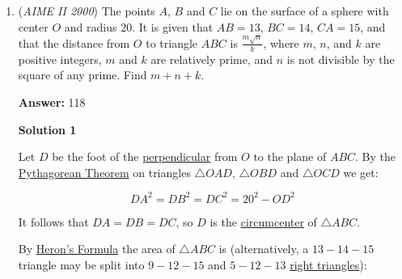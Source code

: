 \begin{enumerate}
\textbf{Solution 2}

A very natural solution: Shift $A$ to the origin. Suppose point $B$ is $(x, kx)$. Note $k$ is the slope we're looking for. Note that point $C$ must be of the form:$(x \pm 1, kx \pm 7)$ or $(x \pm 7, kx \pm 1)$ or $(x \pm 5, kx \pm 5)$. Note that we want the slope of the line connecting $D$ and $C$ so also be $k$, since $AB$ and $CD$ are parallel.Instead of dealing with the 12 cases, we consider point $C$ of the form $(x \pm Y, kx \pm Z)$ where we plug in the necessary values for $Y$ and $Z$ after simplifying.Since the slopes of $AB$ and $CD$ must both be $k$,$\frac{7 - kx \pm Z}{1 - x \pm Y} = k \implies k = \frac{7 \pm Z}{1 \pm Y}$. Plugging in the possible values of $\pm 7, \pm 1, \pm 5$ in their respective pairs and ruling out degenerate cases, we find the sum is $\frac{119}{12} \implies m + n = \boxed{131}$- whatRthose

 [Note: This Solution is a lot faster if you rule out $(Y, Z) = (1, 7)$ due to degeneracy: $k$ cannot equal $0$ (parallel to x-axis), undefined (parallel to y-axis), or $7$ (parallel to $AD$).]

 


	\item (\textit{AIME II 2000}) The points $A$, $B$ and $C$ lie on the surface of a sphere with center $O$ and radius $20$. It is given that $AB=13$, $BC=14$, $CA=15$, and that the distance from $O$ to triangle $ABC$ is $\frac{m\sqrt{n}}k$, where $m$, $n$, and $k$ are positive integers, $m$ and $k$ are relatively prime, and $n$ is not divisible by the square of any prime. Find $m+n+k$.


 
 \textbf{Answer: }118



\textbf{Solution 1}

Let $D$ be the foot of the \href{https://artofproblemsolving.com/wiki/index.php?title=Perpendicular}{perpendicular} from $O$ to the plane of $ABC$. By the \href{https://artofproblemsolving.com/wiki/index.php?title=Pythagorean\_Theorem}{Pythagorean Theorem} on triangles $\triangle OAD$, $\triangle OBD$ and $\triangle OCD$ we get:

 
 \[DA^2=DB^2=DC^2=20^2-OD^2\]

 It follows that $DA=DB=DC$, so $D$ is the \href{https://artofproblemsolving.com/wiki/index.php?title=Circumcenter}{circumcenter} of $\triangle ABC$.

 By \href{https://artofproblemsolving.com/wiki/index.php?title=Heron\%27s\_Formula}{Heron's Formula} the area of $\triangle ABC$ is (alternatively, a $13-14-15$ triangle may be split into $9-12-15$ and $5-12-13$ \href{https://artofproblemsolving.com/wiki/index.php?title=Right\_triangle}{right triangles}):


\end{enumerate}
